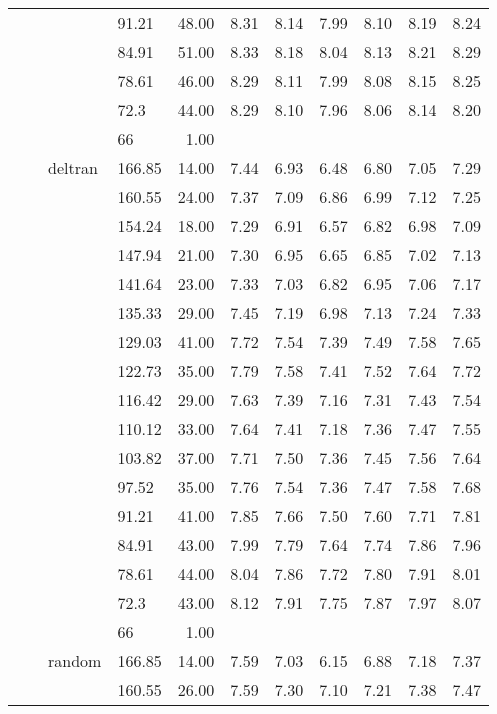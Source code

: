 \begin{longtable}{llllrrrrrrr}
   &  &  & 91.21 & 48.00 & 8.31 & 8.14 & 7.99 & 8.10 & 8.19 & 8.24 \\ 
   &  &  & 84.91 & 51.00 & 8.33 & 8.18 & 8.04 & 8.13 & 8.21 & 8.29 \\ 
   &  &  & 78.61 & 46.00 & 8.29 & 8.11 & 7.99 & 8.08 & 8.15 & 8.25 \\ 
   &  &  & 72.3 & 44.00 & 8.29 & 8.10 & 7.96 & 8.06 & 8.14 & 8.20 \\ 
   &  &  & 66 & 1.00 &  &  &  &  &  &  \\ 
   &  & deltran & 166.85 & 14.00 & 7.44 & 6.93 & 6.48 & 6.80 & 7.05 & 7.29 \\ 
   &  &  & 160.55 & 24.00 & 7.37 & 7.09 & 6.86 & 6.99 & 7.12 & 7.25 \\ 
   &  &  & 154.24 & 18.00 & 7.29 & 6.91 & 6.57 & 6.82 & 6.98 & 7.09 \\ 
   &  &  & 147.94 & 21.00 & 7.30 & 6.95 & 6.65 & 6.85 & 7.02 & 7.13 \\ 
   &  &  & 141.64 & 23.00 & 7.33 & 7.03 & 6.82 & 6.95 & 7.06 & 7.17 \\ 
   &  &  & 135.33 & 29.00 & 7.45 & 7.19 & 6.98 & 7.13 & 7.24 & 7.33 \\ 
   &  &  & 129.03 & 41.00 & 7.72 & 7.54 & 7.39 & 7.49 & 7.58 & 7.65 \\ 
   &  &  & 122.73 & 35.00 & 7.79 & 7.58 & 7.41 & 7.52 & 7.64 & 7.72 \\ 
   &  &  & 116.42 & 29.00 & 7.63 & 7.39 & 7.16 & 7.31 & 7.43 & 7.54 \\ 
   &  &  & 110.12 & 33.00 & 7.64 & 7.41 & 7.18 & 7.36 & 7.47 & 7.55 \\ 
   &  &  & 103.82 & 37.00 & 7.71 & 7.50 & 7.36 & 7.45 & 7.56 & 7.64 \\ 
   &  &  & 97.52 & 35.00 & 7.76 & 7.54 & 7.36 & 7.47 & 7.58 & 7.68 \\ 
   &  &  & 91.21 & 41.00 & 7.85 & 7.66 & 7.50 & 7.60 & 7.71 & 7.81 \\ 
   &  &  & 84.91 & 43.00 & 7.99 & 7.79 & 7.64 & 7.74 & 7.86 & 7.96 \\ 
   &  &  & 78.61 & 44.00 & 8.04 & 7.86 & 7.72 & 7.80 & 7.91 & 8.01 \\ 
   &  &  & 72.3 & 43.00 & 8.12 & 7.91 & 7.75 & 7.87 & 7.97 & 8.07 \\ 
   &  &  & 66 & 1.00 &  &  &  &  &  &  \\ 
   &  & random & 166.85 & 14.00 & 7.59 & 7.03 & 6.15 & 6.88 & 7.18 & 7.37 \\ 
   &  &  & 160.55 & 26.00 & 7.59 & 7.30 & 7.10 & 7.21 & 7.38 & 7.47 \\ 

\end{longtable}
